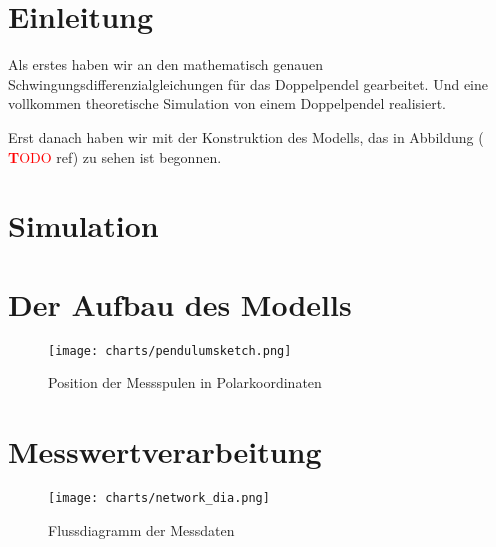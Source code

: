 \documentclass[a4paper, 10pt]{article}
\title{\mytitle}
\author{\myauthor}
\newcommand{\TODO}{\textcolor{red}{ \textbf TODO }}
\begin{document}
\maketitle
\begin{abstract}
In unserem Projekt beschäftigen wir uns mit dem Verhalten von chaotischen Doppelpendeln. Wir wollen aus der aktuellen Bewegung eines Doppelpendels den weiteren Bewegungsablauf in einem kurzen Zeitintervall extrapolieren und dann versuchen, diese Bewegung zu beeinflussen.

Hierzu wollen wir zunächst ein Doppelpendel konstruieren, bei dem Daten über den aktuellen Bewegungszustand erfasst werden können. Diese Daten sollen in Echtzeit von einem Computer ausgewertet werden, um laufend eine Prognose an die Messwerte anzupassen. Anhand dieser Prognose soll dann entschieden werden, ob das Pendel eine unerwünschte Bewegung durchführen wird, und wenn nötig, soll mithilfe mehrerer Spulen eine korrigierende magnetische Kraft erzeugt werden. Es könnte zum Beispiel erwünscht sein, einen Überschlag zu vermeiden.
\end{abstract}

\clearpage
\pagestyle{fancy}
\tableofcontents

\clearpage

\section{Einleitung}
Als erstes haben wir an den mathematisch genauen Schwingungsdifferenzialgleichungen für das Doppelpendel gearbeitet.
Und eine vollkommen theoretische Simulation von einem Doppelpendel realisiert.

Erst danach haben wir mit der Konstruktion des Modells, das in Abbildung (\TODO ref) zu sehen ist begonnen.

\section{Simulation}


\section{Der Aufbau des Modells}

\begin{figure}
  \texttt{[image: charts/pendulumsketch.png]}
  \caption{Position der Messspulen in Polarkoordinaten}
  \label{fig:pendulumsketch}
\end{figure}



\section{Messwertverarbeitung}
\begin{figure}
  \texttt{[image: charts/network\_dia.png]}
  \caption{Flussdiagramm der Messdaten}
  \label{fig:network}
\end{figure}

\clearpage
{}

{}
\end{document}
